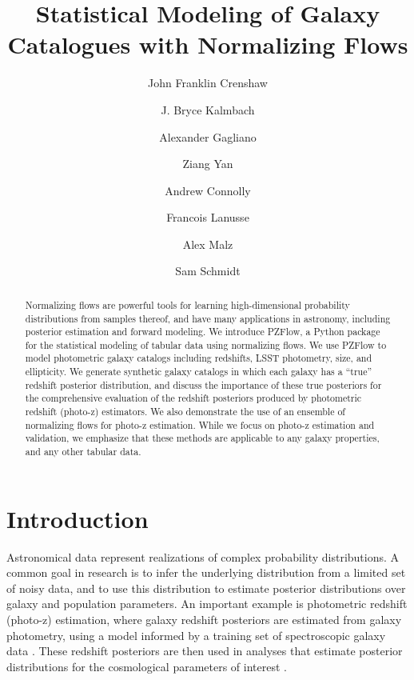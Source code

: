 \documentclass[twocolumn]{aastex631}
\begin{document}
\title{Statistical Modeling of Galaxy Catalogues with Normalizing Flows}


\author[0000-0002-2495-3514]{John Franklin Crenshaw}

\author{J. Bryce Kalmbach}

\author{Alexander Gagliano}

\author{Ziang Yan}

\author{Andrew Connolly}

\author{Francois Lanusse}

\author{Alex Malz}

\author{Sam Schmidt}



\begin{abstract}
    Normalizing flows are powerful tools for learning high-dimensional probability distributions from samples thereof, and have many applications in astronomy, including posterior estimation and forward modeling.
    We introduce PZFlow, a Python package for the statistical modeling of tabular data using normalizing flows.
    We use PZFlow to model photometric galaxy catalogs including redshifts, LSST photometry, size, and ellipticity.
    We generate synthetic galaxy catalogs in which each galaxy has a ``true'' redshift posterior distribution, and discuss the importance of these true posteriors for the comprehensive evaluation of the redshift posteriors produced by photometric redshift (photo-z) estimators.
    We also demonstrate the use of an ensemble of normalizing flows for photo-z estimation.
    While we focus on photo-z estimation and validation, we emphasize that these methods are applicable to any galaxy properties, and any other tabular data.
\end{abstract}


\section{Introduction}
\label{sec:intro}

Astronomical data represent realizations of complex probability distributions.
A common goal in research is to infer the underlying distribution from a limited set of noisy data, and to use this distribution to estimate posterior distributions over galaxy and population parameters.
An important example is photometric redshift (photo-z) estimation, where galaxy redshift posteriors are estimated from galaxy photometry, using a model informed by a training set of spectroscopic galaxy data \citep{newman2022}.
These redshift posteriors are then used in analyses that estimate posterior distributions for the cosmological parameters of interest \citep{descSRD}.
\end{document}
